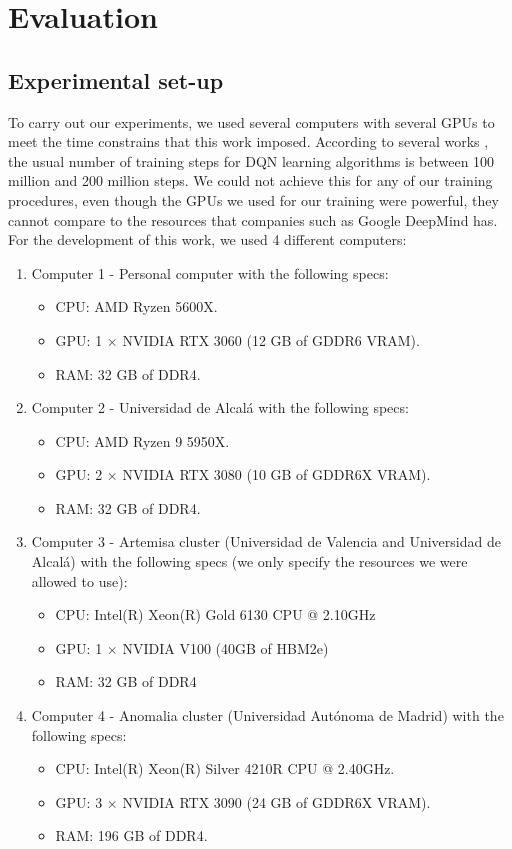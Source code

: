 \chapter{Evaluation}
\label{cha:evaluation}

\section{Experimental set-up}
\label{sec:exp_setup}
To carry out our experiments, we used several computers with several GPUs to meet the time constrains that this work imposed. According to several works \cite{mnih2013playing, hessel2017rainbow, schaul2016prioritized, meng2024deep}, the usual number of training steps for DQN learning algorithms is between 100 million and 200 million steps. We could not achieve this for any of our training procedures, even though the GPUs we used for our training were powerful, they cannot compare to the resources that companies such as Google DeepMind has. For the development of this work, we used 4 different computers:

\begin{enumerate}
	\item Computer 1 - Personal computer with the following specs:
	\begin{itemize}
		\item CPU: AMD Ryzen 5600X.
		\item GPU: 1 $\times$ NVIDIA RTX 3060 (12 GB of GDDR6 VRAM).
		\item RAM: 32 GB of DDR4.
	\end{itemize}
	\item Computer 2 - Universidad de Alcalá with the following specs:
	\begin{itemize}
		\item CPU: AMD Ryzen 9 5950X.
		\item GPU: 2 $\times$ NVIDIA RTX 3080 (10 GB of GDDR6X VRAM).
		\item RAM: 32 GB of DDR4.
	\end{itemize} 
	\item Computer 3 - Artemisa cluster (Universidad de Valencia and Universidad de Alcalá) with the following specs (we only specify the resources we were allowed to use):
	\begin{itemize}
		\item CPU: Intel(R) Xeon(R) Gold 6130 CPU @ 2.10GHz
		\item GPU: 1 $\times$ NVIDIA V100 (40GB of HBM2e)
		\item RAM: 32 GB of DDR4
	\end{itemize} 
	\item Computer 4 - Anomalia cluster (Universidad Autónoma de Madrid) with the following specs:
	\begin{itemize}
		\item CPU: Intel(R) Xeon(R) Silver 4210R CPU @ 2.40GHz.
		\item GPU: 3 $\times$ NVIDIA RTX 3090 (24 GB of GDDR6X VRAM).
		\item RAM: 196 GB of DDR4.
	\end{itemize} 
\end{enumerate}

